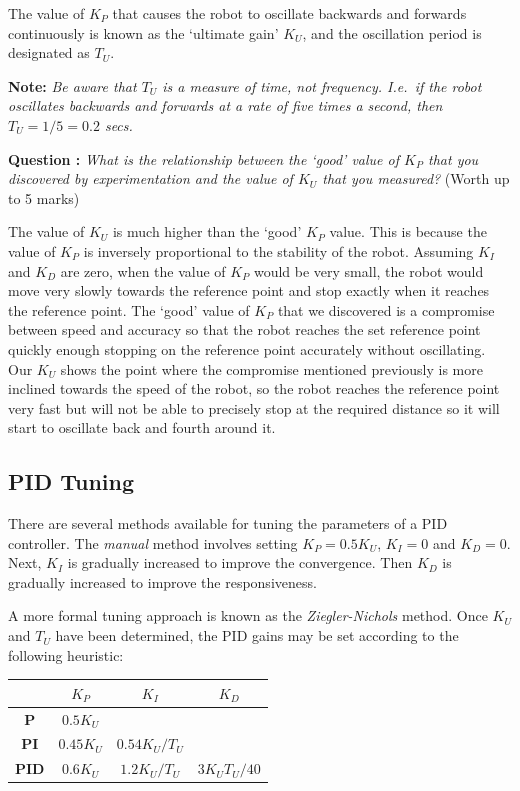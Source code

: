 \documentclass[hidelinks,a4paper,11pt]{article}
\newcounter{question}
\newcommand\myq{\refstepcounter{question}\thequestion}
\begin{document}
\vspace*{\baselineskip}

The value of $K_P$ that causes the robot to oscillate backwards and forwards continuously is known
as the `ultimate gain' $K_U$, and the oscillation period is designated as $T_U$.

{\bfseries Note:}  \emph{Be aware that $T_U$ is a measure of time, not frequency.  I.e.\ if the
robot oscillates backwards and forwards at a rate of five times a second, then $T_U=1/5=0.2$ secs.}

{\bfseries Question \myq:}  \emph{What is the relationship between the `good' value of $K_P$ that
you discovered by experimentation and the value of $K_U$ that you measured?} (Worth up to 5 marks)\\
\begin{mdframed}
The value of $K_U$ is much higher than the `good' $K_P$ value. This is because the value of $K_P$ is
inversely proportional to the stability of the robot. Assuming $K_I$ and $K_D$ are zero, when the
value of $K_P$ would be very small, the robot would move very slowly towards the reference point and
stop exactly when it reaches the reference point. The `good' value of $K_P$ that we discovered is a
compromise between speed and accuracy so that the robot reaches the set reference point quickly
enough stopping on the reference point accurately without oscillating. Our $K_U$ shows the point
where the compromise mentioned previously is more inclined towards the speed of the robot, so the
robot reaches the reference point very fast but will not be able to precisely stop at the required
distance so it will start to oscillate back and fourth around it.
\end{mdframed}
 \vspace*{\baselineskip}


\subsection {PID Tuning}

There are several methods available for tuning the parameters of a PID controller.  The
\emph{manual} method involves setting $K_P=0.5K_U$, $K_I=0$ and $K_D=0$.  Next, $K_I$ is gradually
increased to improve the convergence.  Then $K_D$ is gradually increased to improve the
responsiveness.

A more formal tuning approach is known as the \emph{Ziegler-Nichols} method.  Once $K_U$ and $T_U$
have been determined, the PID gains may be set according to the following heuristic:
\begin{center}
	\begin{tabular}{ | c | c | c | c | } \hline
		 & \bf{$K_P$} & \bf{$K_I$} & \bf{$K_D$} \\ \hline
		\bf{P} & $0.5K_U$ &  &  \\ \hline
		\bf{PI} & $0.45K_U$ & $0.54K_U/T_U$ &  \\ \hline
		\bf{PID} & $0.6K_U$ & $1.2K_U/T_U$ & $3K_UT_U/40$ \\ \hline
	\end{tabular}
\end{center}
\vspace*{\baselineskip}
\end{document}
